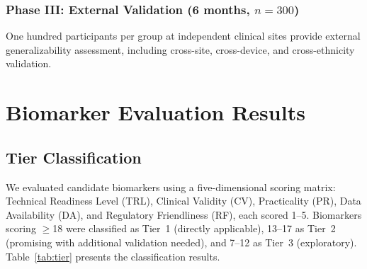 \documentclass[conference]{IEEEtran}
\begin{document}
\subsubsection{Phase III: External Validation (6 months, $n=300$)}
One hundred participants per group at independent clinical sites provide external generalizability assessment, including cross-site, cross-device, and cross-ethnicity validation.

\section{Biomarker Evaluation Results}

\subsection{Tier Classification}

We evaluated candidate biomarkers using a five-dimensional scoring matrix: Technical Readiness Level (TRL), Clinical Validity (CV), Practicality (PR), Data Availability (DA), and Regulatory Friendliness (RF), each scored 1--5. Biomarkers scoring $\geq$18 were classified as Tier~1 (directly applicable), 13--17 as Tier~2 (promising with additional validation needed), and 7--12 as Tier~3 (exploratory). Table~\ref{tab:tier} presents the classification results.
\end{document}
